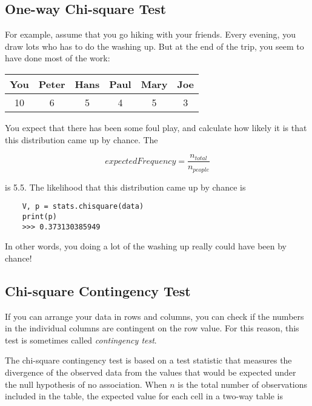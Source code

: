 \subsection{One-way Chi-square Test}

For example, assume that you go hiking with your friends. Every evening, you draw lots who has to do the washing up.
But at the end of the trip, you seem to have done most of the work:

\begin{table}[h]
    \centering
    \begin{tabular}{c|c|c|c|c|c}
      You & Peter & Hans & Paul & Mary & Joe \\
      \hline
      10 & 6 & 5 & 4 & 5 & 3 \\
    \end{tabular}
\end{table}

You expect that there has been some foul play, and calculate how likely it is that this distribution came up by chance. The

\begin{equation}
  expectedFrequency = \frac{n_{total}}{n_{people}}
\end{equation}

is 5.5. The likelihood that this distribution came up by chance is

\begin{lstlisting}
    V, p = stats.chisquare(data)
    print(p)
    >>> 0.373130385949
\end{lstlisting}

In other words, you doing a lot of the washing up really could have been by chance!

\subsection{Chi-square Contingency Test} 

If you can arrange your data in rows and columns, you can check if the numbers in the individual columns are contingent on the row value. For this reason, this test is sometimes called \emph{contingency test}.

The chi-square contingency test is based on a test statistic that measures the divergence of the observed data from the values that would be expected under the null hypothesis of no association. When $n$ is the total number of observations included in the table, the expected value for each cell in a two-way table is


